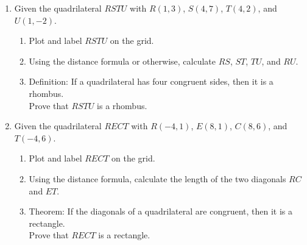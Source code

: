 \documentclass[12pt, twoside]{article}
\begin{document}
\begin{enumerate}
      \item Given the quadrilateral $RSTU$ with $R(1,3)$, $S(4,7)$, $T(4,2)$, and $U(1,-2)$.
        \begin{enumerate}
          \item Plot and label $RSTU$ on the grid.
          \item Using the distance formula or otherwise, calculate $RS$, $ST$, $TU$, and $RU$.
          \item Definition: If a quadrilateral has four congruent sides, then it is a rhombus.\\[0.5cm]
          Prove that $RSTU$ is a rhombus.
        \end{enumerate}
        \begin{center} %
        \end{center}

    \item Given the quadrilateral $RECT$ with $R(-4,1)$, $E(8,1)$, $C(8,6)$, and $T(-4,6)$.
      \begin{enumerate}
        \item Plot and label $RECT$ on the grid.
        \item Using the distance formula, calculate the length of the two diagonals $RC$ and $ET$.
        \item Theorem: If the diagonals of a quadrilateral are congruent, then it is a rectangle.\\[0.5cm]
        Prove that $RECT$ is a rectangle.
      \end{enumerate}
      \begin{center} %
      \end{center}


\end{enumerate}
\end{document}
